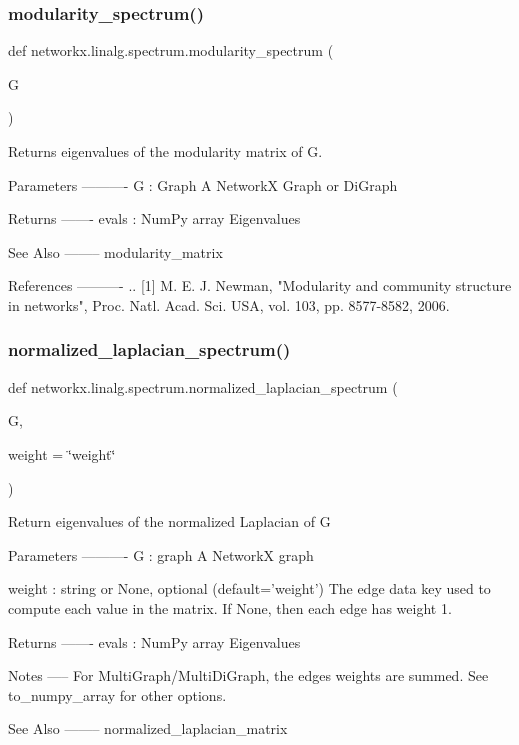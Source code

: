\subsubsection{\texorpdfstring{modularity\+\_\+spectrum()}{modularity\_spectrum()}}
{\footnotesize\ttfamily def networkx.\+linalg.\+spectrum.\+modularity\+\_\+spectrum (\begin{DoxyParamCaption}\item[{}]{G }\end{DoxyParamCaption})}

\begin{DoxyVerb}Returns eigenvalues of the modularity matrix of G.

Parameters
----------
G : Graph
   A NetworkX Graph or DiGraph

Returns
-------
evals : NumPy array
  Eigenvalues

See Also
--------
modularity_matrix

References
----------
.. [1] M. E. J. Newman, "Modularity and community structure in networks",
   Proc. Natl. Acad. Sci. USA, vol. 103, pp. 8577-8582, 2006.
\end{DoxyVerb}
 \mbox{\label{namespacenetworkx_1_1linalg_1_1spectrum_a8c63fefa8333b1c2e76ad1f5db2ca60d}} 
\subsubsection{\texorpdfstring{normalized\+\_\+laplacian\+\_\+spectrum()}{normalized\_laplacian\_spectrum()}}
{\footnotesize\ttfamily def networkx.\+linalg.\+spectrum.\+normalized\+\_\+laplacian\+\_\+spectrum (\begin{DoxyParamCaption}\item[{}]{G,  }\item[{}]{weight = {\ttfamily \char`\"{}weight\char`\"{}} }\end{DoxyParamCaption})}

\begin{DoxyVerb}Return eigenvalues of the normalized Laplacian of G

Parameters
----------
G : graph
   A NetworkX graph

weight : string or None, optional (default='weight')
   The edge data key used to compute each value in the matrix.
   If None, then each edge has weight 1.

Returns
-------
evals : NumPy array
  Eigenvalues

Notes
-----
For MultiGraph/MultiDiGraph, the edges weights are summed.
See to_numpy_array for other options.

See Also
--------
normalized_laplacian_matrix
\end{DoxyVerb}
 